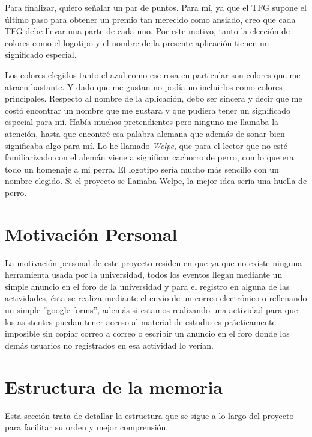 Para finalizar, quiero señalar un par de puntos. Para mí, ya que el TFG supone el último paso para obtener un premio tan merecido como ansiado, creo que cada TFG debe llevar una parte de cada uno. Por este motivo, tanto la elección de colores como el logotipo y el nombre de la presente aplicación tienen un significado especial. 


Los colores elegidos tanto el azul como ese rosa en particular son colores que me atraen bastante. Y dado que me gustan no podía no incluirlos como colores principales.
Respecto al nombre de la aplicación, debo ser sincera y decir que me costó encontrar un nombre que me gustara y que pudiera tener un significado especial para mí. Había muchos pretendientes pero ninguno me llamaba la atención, hasta que encontré esa palabra alemana que además de sonar bien significaba algo para mí. Lo he llamado \textit{Welpe}, que para el lector que no esté familiarizado con el alemán viene a significar cachorro de perro, con lo que era todo un homenaje a mi perra. El logotipo sería mucho más sencillo con un nombre elegido. Si el proyecto se llamaba Welpe, la mejor idea sería una huella de perro.



\section{Motivación Personal}
La motivación personal de este proyecto residen en que ya que no existe ninguna herramienta usada por la universidad, todos los eventos llegan mediante un simple anuncio en el foro de la universidad y para el registro en alguna de las actividades, ésta se realiza mediante el envío de un correo electrónico o rellenando un simple ''google forms'', además si estamos realizando una actividad para que los asistentes puedan tener acceso al material de estudio es prácticamente imposible sin copiar correo a correo o escribir un anuncio en el foro donde los demás usuarios no registrados en esa actividad lo verían. 


\section{Estructura de la memoria}
Esta sección trata de detallar la estructura que se sigue a lo largo del proyecto para facilitar su orden y mejor comprensión.


